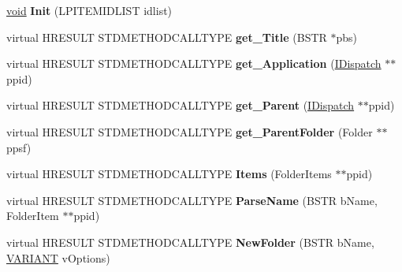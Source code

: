 \begin{DoxyCompactItemize}
\item 
\mbox{\label{class_c_folder_ae7c26f3b6b26ef7c83b65f3e90140163}} 
\hyperlink{interfacevoid}{void} {\bfseries Init} (L\+P\+I\+T\+E\+M\+I\+D\+L\+I\+ST idlist)
\item 
\mbox{\label{class_c_folder_a6ad3e2c2f6a670e279d4bacee05a60e6}} 
virtual H\+R\+E\+S\+U\+LT S\+T\+D\+M\+E\+T\+H\+O\+D\+C\+A\+L\+L\+T\+Y\+PE {\bfseries get\+\_\+\+Title} (B\+S\+TR $\ast$pbs)
\item 
\mbox{\label{class_c_folder_a7c0672c33c9572c1e31fcad78bc26a9f}} 
virtual H\+R\+E\+S\+U\+LT S\+T\+D\+M\+E\+T\+H\+O\+D\+C\+A\+L\+L\+T\+Y\+PE {\bfseries get\+\_\+\+Application} (\hyperlink{interface_i_dispatch}{I\+Dispatch} $\ast$$\ast$ppid)
\item 
\mbox{\label{class_c_folder_a79a427e5efc3299b01509b9d4086c26f}} 
virtual H\+R\+E\+S\+U\+LT S\+T\+D\+M\+E\+T\+H\+O\+D\+C\+A\+L\+L\+T\+Y\+PE {\bfseries get\+\_\+\+Parent} (\hyperlink{interface_i_dispatch}{I\+Dispatch} $\ast$$\ast$ppid)
\item 
\mbox{\label{class_c_folder_a40996e58126eb5789b7814bdcfbfaaca}} 
virtual H\+R\+E\+S\+U\+LT S\+T\+D\+M\+E\+T\+H\+O\+D\+C\+A\+L\+L\+T\+Y\+PE {\bfseries get\+\_\+\+Parent\+Folder} (Folder $\ast$$\ast$ppsf)
\item 
\mbox{\label{class_c_folder_a0a80e4172938380fd691926fb37b7bac}} 
virtual H\+R\+E\+S\+U\+LT S\+T\+D\+M\+E\+T\+H\+O\+D\+C\+A\+L\+L\+T\+Y\+PE {\bfseries Items} (Folder\+Items $\ast$$\ast$ppid)
\item 
\mbox{\label{class_c_folder_a60ce88fd8fd23627c6cd009347163062}} 
virtual H\+R\+E\+S\+U\+LT S\+T\+D\+M\+E\+T\+H\+O\+D\+C\+A\+L\+L\+T\+Y\+PE {\bfseries Parse\+Name} (B\+S\+TR b\+Name, Folder\+Item $\ast$$\ast$ppid)
\item 
\mbox{\label{class_c_folder_a7e145bd3495b22ab089c0aa5463ef79a}} 
virtual H\+R\+E\+S\+U\+LT S\+T\+D\+M\+E\+T\+H\+O\+D\+C\+A\+L\+L\+T\+Y\+PE {\bfseries New\+Folder} (B\+S\+TR b\+Name, \hyperlink{structtag_v_a_r_i_a_n_t}{V\+A\+R\+I\+A\+NT} v\+Options)
$$
\end{DoxyCompactItemize}
